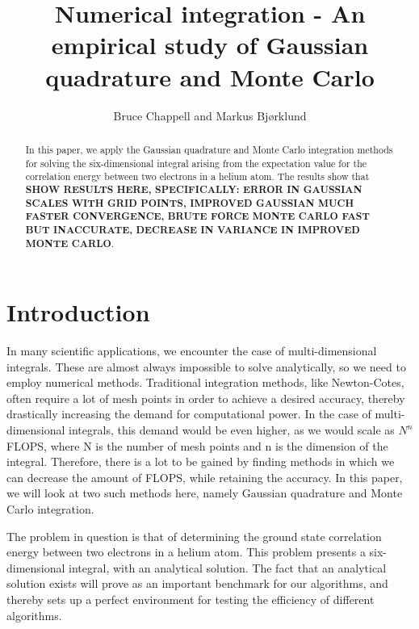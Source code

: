 \documentclass{emulateapj}
\begin{document}
\title{Numerical integration - An empirical study of Gaussian quadrature and Monte Carlo}

\author{Bruce Chappell and Markus Bjørklund}



\begin{abstract}
In this paper, we apply the Gaussian quadrature and Monte Carlo integration methods for solving the six-dimensional integral arising from the expectation value for the correlation energy between two electrons in a helium atom. The results show that \textbf{SHOW RESULTS HERE, SPECIFICALLY: ERROR IN GAUSSIAN SCALES WITH GRID POINTS, IMPROVED GAUSSIAN MUCH FASTER CONVERGENCE, BRUTE FORCE MONTE CARLO FAST BUT INACCURATE, DECREASE IN VARIANCE IN IMPROVED MONTE CARLO}.

\end{abstract}

\section{Introduction}
\label{sec:introduction}

In many scientific applications, we encounter the case of multi-dimensional integrals. These are almost always impossible to solve analytically, so we need to employ numerical methods. Traditional integration methods, like Newton-Cotes, often require a lot of mesh points in order to achieve a desired accuracy, thereby drastically increasing the demand for computational power. In the case of multi-dimensional integrals, this demand would be even higher, as we would scale as $N^n$ FLOPS, where N is the number of mesh points and n is the dimension of the integral. Therefore, there is a lot to be gained by finding methods in which we can decrease the amount of FLOPS, while retaining the accuracy. In this paper, we will look at two such methods here, namely Gaussian quadrature and Monte Carlo integration.

The problem in question is that of determining the ground state correlation energy between two electrons in a helium atom. This problem presents a six-dimensional integral, with an analytical solution. The fact that an analytical solution exists will prove as an important benchmark for our algorithms, and thereby sets up a perfect environment for testing the efficiency of different algorithms.
\end{document}
